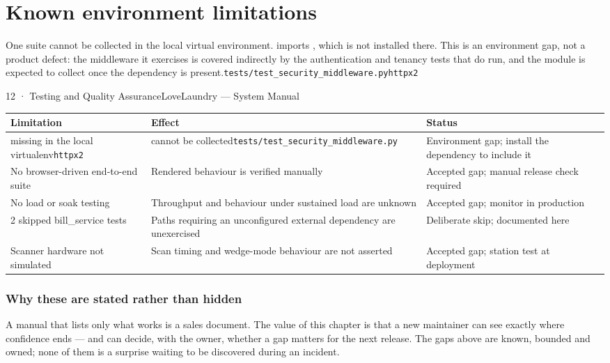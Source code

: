 \documentclass[11pt,a4paper,oneside]{book}
\begin{document}
\section*{Known environment limitations}
One suite cannot be collected in the local virtual environment.  imports , which is not installed there. This is an environment gap, not a product defect: the middleware it exercises is covered indirectly by the authentication and tenancy tests that do run, and the module is expected to collect once the dependency is present.\texttt{tests/test\_security\_middleware.py}\texttt{httpx2}

12 · Testing and Quality AssuranceLoveLaundry — System Manual

\begin{center}\small
\begin{tabularx}{\linewidth}{|X|X|X|}
\hline
\rowcolor{lightgrey}
\textbf{Limitation} & \textbf{Effect} & \textbf{Status} \\ \hline
missing in the local virtualenv\texttt{httpx2} & cannot be collected\texttt{tests/test\_security\_middleware.py} & Environment gap; install the dependency to include it \\ \hline
No browser-driven end-to-end suite & Rendered behaviour is verified manually & Accepted gap; manual release check required \\ \hline
No load or soak testing & Throughput and behaviour under sustained load are unknown & Accepted gap; monitor in production \\ \hline
2 skipped bill\_service tests & Paths requiring an unconfigured external dependency are unexercised & Deliberate skip; documented here \\ \hline
Scanner hardware not simulated & Scan timing and wedge-mode behaviour are not asserted & Accepted gap; station test at deployment \\ \hline
\end{tabularx}
\end{center}
\subsubsection*{Why these are stated rather than hidden}
A manual that lists only what works is a sales document. The value of this chapter is that a new maintainer can see exactly where confidence ends — and can decide, with the owner, whether a gap matters for the next release. The gaps above are known, bounded and owned; none of them is a surprise waiting to be discovered during an incident.
\end{document}
